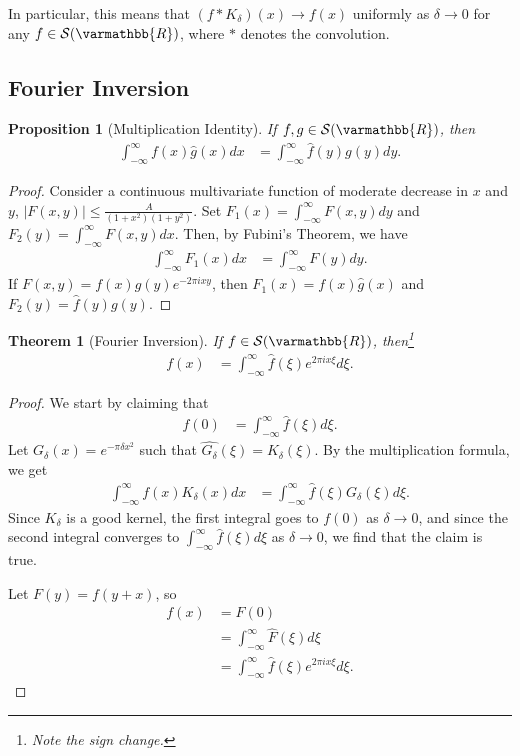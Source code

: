 \documentclass[12pt]{extarticle}
\newcommand{\R}{\varmathbb{R}}
\theoremstyle{plain}
\newtheorem*{theorem}{Theorem}%
\newtheorem*{proposition}{Proposition}%
\theoremstyle{definition}
\theoremstyle{remark}
\renewcommand{\newline}{\hfill\break}
\begin{document}
  In particular, this means that $(f\ast K_{\delta})(x) \rightarrow f(x)$ uniformly as $\delta \rightarrow 0$ for any $f\in \mathcal{S}(\R)$, where $\ast$ denotes the convolution.
  \subsection{Fourier Inversion}%
  \begin{proposition}[Multiplication Identity]
    If $f,g\in \mathcal{S}(\R)$, then
    \begin{align*}
      \int_{-\infty}^{\infty}f(x)\hat{g}(x)dx &= \int_{-\infty}^{\infty}\hat{f}(y)g(y)dy.
    \end{align*}
  \end{proposition}
  \begin{proof}
    Consider a continuous multivariate function of moderate decrease in $x$ and $y$, $|F(x,y)| \leq \frac{A}{(1+x^2)(1+y^2)}$. Set $F_1(x) = \int_{-\infty}^{\infty}F(x,y)dy$ and $F_2(y) = \int_{-\infty}^{\infty}F(x,y)dx$. Then, by Fubini's Theorem, we have
    \begin{align*}
      \int_{-\infty}^{\infty}F_1(x)dx &= \int_{-\infty}^{\infty}F(y)dy.
    \end{align*}
    If $F(x,y) = f(x)g(y)e^{-2\pi i x y}$, then $F_1(x) = f(x)\hat{g}(x)$ and $F_2(y) = \hat{f}(y)g(y)$.
  \end{proof}
  \begin{theorem}[Fourier Inversion]
    If $f\in \mathcal{S}(\R)$, then\footnote{Note the sign change.}
    \begin{align*}
      f(x) &= \int_{-\infty}^{\infty}\hat{f}(\xi)e^{2\pi i x \xi}d\xi.
    \end{align*}
  \end{theorem}
  \begin{proof}
    We start by claiming that
    \begin{align*}
      f(0) &= \int_{-\infty}^{\infty}\hat{f}(\xi)d\xi.
    \end{align*}
    Let $G_{\delta}(x) = e^{-\pi \delta x^2}$ such that $\widehat{G_{\delta}}(\xi) = K_{\delta}(\xi)$. By the multiplication formula, we get
    \begin{align*}
      \int_{-\infty}^{\infty}f(x)K_{\delta}(x) dx &= \int_{-\infty}^{\infty}\hat{f}(\xi)G_{\delta}(\xi)d\xi.
    \end{align*}
    Since $K_{\delta}$ is a good kernel, the first integral goes to $f(0)$ as $\delta \rightarrow 0$, and since the second integral converges to $\int_{-\infty}^{\infty}\hat{f}(\xi)d\xi$ as $\delta \rightarrow 0$, we find that the claim is true.\newline

    Let $F(y) = f(y+x)$, so
    \begin{align*}
      f(x) &= F(0)\\
           &= \int_{-\infty}^{\infty}\hat{F}(\xi)d\xi\\
           &= \int_{-\infty}^{\infty}\hat{f}(\xi)e^{2\pi i x \xi}d\xi.
    \end{align*}
  \end{proof}
\end{document}
